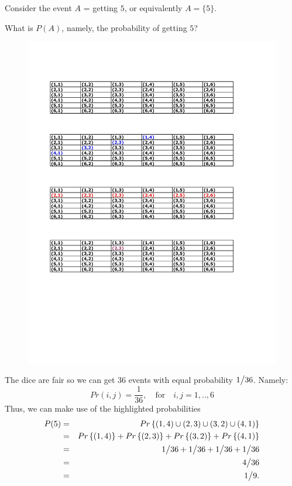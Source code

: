 \documentclass[notes=show, handout]{beamer}\usepackage[]{graphicx}\usepackage[]{color}
\newcommand{\bea}{\begin{eqnarray}}
\newcommand{\eea}{\end{eqnarray}}
\newcommand{\nn}{\nonumber}
\begin{document}
\begin{frame}{\secname}

  \begin{example}[cont'd]
  Consider the event $A$ = getting $5$, or equivalently $A=\{ 5\}$.

  What is $P(A)$, namely, the probability of getting $5$?

  \begin{figure}[h!]
  \centering
  \includegraphics[scale=0.7]{img/c2.pdf}
  \end{figure}
  \end{example}
\end{frame}


\begin{frame}{\secname}

  \begin{example}[cont'd]
  The dice are fair so we can get 36 events with equal probability ${1}\big \slash{36}$. Namely:
  $$
  Pr(i,j) = \frac{1}{36}, \quad \text{for} \quad i,j=1,..,6
  $$
  Thus, we can make use of the highlighted probabilities
  \bea
  P(5) &=& Pr\left\{ (1,4) \cup (2,3) \cup (3,2) \cup  (4,1) \right\} \nn \\
  &=& Pr\left\{ (1,4)  \right\} +  Pr\left\{ (2,3)  \right\} +  Pr\left\{(3,2)  \right\} + Pr\left\{  (4,1) \right\} \nn \\
  &=& {1}\big \slash{36} + {1}\big \slash{36} + {1}\big \slash{36} + {1}\big \slash{36} \nn \\
  &=& {4}\big \slash{36} \nn \\
  &=& 1 \big \slash{9}. \nn
  \eea
  \end{example}
\end{frame}
\end{document}

